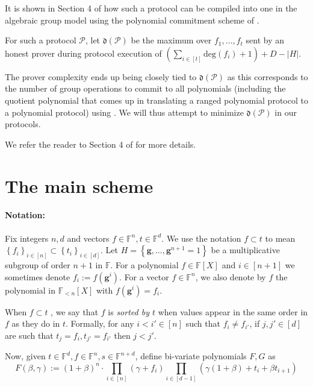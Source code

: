 \documentclass[11pt]{article} %
\newcommand{\F}{\ensuremath{\mathbb F}\xspace}
\renewcommand{\deg}{\ensuremath{\mathrm{deg}}\xspace}
\newcommand{\defeq}{:=}
\newcommand{\dom}{\ensuremath{H}\xspace}
\newcommand{\sett}[2]{\ensuremath{\set{#1}_{#2}}\xspace}
\newcommand{\set}[1]{\ensuremath{\left\{#1\right\}}\xspace}
\newcommand{\hgen}{\ensuremath{\mathbf{g}}\xspace}
\newcommand{\cosetgen}{\ensuremath{\mathbf{\kappa}}\xspace}
\newcommand{\polysofdeg}[1]{\ensuremath{\F_{< #1}[X]}\xspace}
\newcommand{\polyss}{\ensuremath{\F[X]}\xspace}
\newcommand{\prot}{\ensuremath{\mathscr{P}}\xspace}
\newcommand{\aggdeg}[1]{\ensuremath{\mathfrak{d}(#1)}\xspace}
\begin{document}
It is shown in Section 4 of \cite{plonk} how such a protocol can be compiled into one in the algebraic group model using the polynomial commitment scheme of \cite{kate}.


For such a protocol \prot, let $\aggdeg{\prot}$ be the maximum over $f_1,\ldots,f_t$ sent by an honest prover during protocol execution of $\left(\sum_{i\in [t]} \deg(f_i)+1\right)+D-|H|$.

The prover complexity ends up being closely tied to \aggdeg{\prot} as this corresponds to the number of group operations to commit to all polynomials (including the quotient polynomial that comes up in translating a ranged polynomial protocol to a polynomial protocol) using \cite{kate}. We will thus attempt to minimize \aggdeg{\prot} in our protocols.


We refer the reader to Section 4 of \cite{plonk} for more details.
 

\section{The main scheme}\label{sec:mainscheme}


\paragraph{Notation:}

Fix integers $n,d$ and vectors $f\in \F^n, t\in\F^d$.
We use the notation $f\subset t$ to mean $\sett{f_i}{i\in [n]}\subset \sett{t_i}{i\in [d]}$. Let $\dom=\set{\hgen,\ldots,\hgen^{n+1}=1}$ be a multiplicative subgroup of order $n+1$ in \F.
For a polynomial $f\in \polyss$ and $i\in [n+1]$ we sometimes denote $f_i\defeq f(\hgen^i)$.
For a vector $f\in \F^n$, we also denote by $f$ the polynomial in \polysofdeg{n} with $f(\hgen^i) =f_i$.


When $f\subset t$ , we say that $f$ is \emph{sorted by $t$} when values appear in the same order in $f$ as they do in $t$. Formally, for any $i<i'\in [n]$ such that $f_i\neq f_{i'}$, if $j,j'\in [d]$ are such that $t_{j} = f_i, t_{j'} =f_{i'}$ then $j<j'$.

Now, given $t\in \F^d, f\in \F^n, s\in \F^{n+d}$, define bi-variate polynomials $F,G$ as 
\[F(\beta,\gamma) \defeq (1+\beta)^n\cdot \prod_{i\in [n]} (\gamma + f_i) \prod_{i\in [d-1]} (\gamma(1+\beta) + t_i + \beta t_{i+1})\]
                                  
\end{document}
